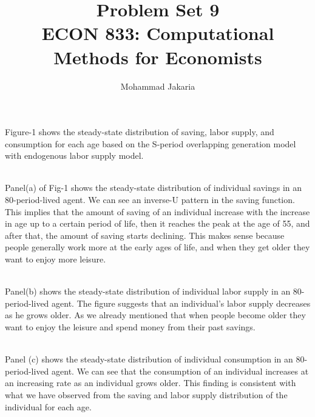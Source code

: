 \documentclass[12 pt, a4paper]{Article}
\begin{document}
\title{Problem Set 9\\ ECON 833: Computational Methods for Economists}
\author{Mohammad Jakaria}
\maketitle

Figure-1 shows the steady-state distribution of saving, labor supply, and consumption for each age based on the S-period overlapping generation model with endogenous labor supply model.\\\

Panel(a) of Fig-1 shows the steady-state distribution of individual savings in an 80-period-lived agent. We can see an inverse-U pattern in the saving function. This implies that the amount of saving of an individual increase with the increase in age up to a certain period of life, then it reaches the peak at the age of 55, and after that, the amount of saving starts declining. 
This makes sense because people generally work more at the early ages of life, and when they get older they want to enjoy more leisure.\\\

Panel(b) shows the steady-state distribution of individual labor supply in an 80-period-lived agent. The figure suggests that an individual's labor supply decreases as he grows older. As we already mentioned that when people become older they want to enjoy the leisure and spend money from their past savings.\\\ 

Panel (c) shows the steady-state distribution of individual consumption in an 80-period-lived agent. We can see that the consumption of an individual increases at an increasing rate as an individual grows older. This finding is consistent with what we have observed from the saving and labor supply distribution of the individual for each age.
\end{document}

